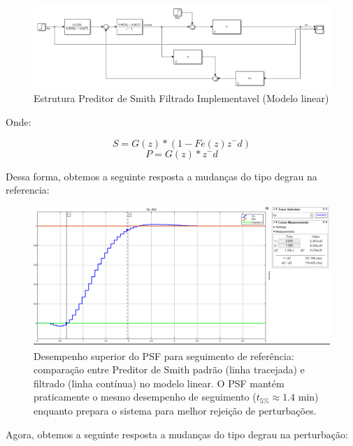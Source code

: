 \documentclass[a4paper,12pt]{article}
\begin{document}
\begin{figure}[H]
    \centering
    \includegraphics[width=0.9\linewidth]{image3.png}
    \caption{Estrutura Preditor de Smith Filtrado Implementavel (Modelo linear)}
    \label{fig:psf_implementation_linear}
\end{figure}

Onde:

\begin{equation}
S = G(z)*(1-Fe(z)z^-d)
\end{equation}
\begin{equation}
P = G(z)*z^-d
\end{equation}

Dessa forma, obtemos a seguinte resposta a mudanças do tipo degrau na referencia:

\begin{figure}[H]
    \centering
    \includegraphics[width=0.9\linewidth]{image4.png}
    \caption{Desempenho superior do PSF para seguimento de referência: comparação entre Preditor de Smith padrão (linha tracejada) e filtrado (linha contínua) no modelo linear. O PSF mantém praticamente o mesmo desempenho de seguimento ($t_{5\%} \approx 1.4$ min) enquanto prepara o sistema para melhor rejeição de perturbações.}
    \label{fig:psf_step_response_ref}
\end{figure}

Agora, obtemos a seguinte resposta a mudanças do tipo degrau na perturbação:
\end{document}

